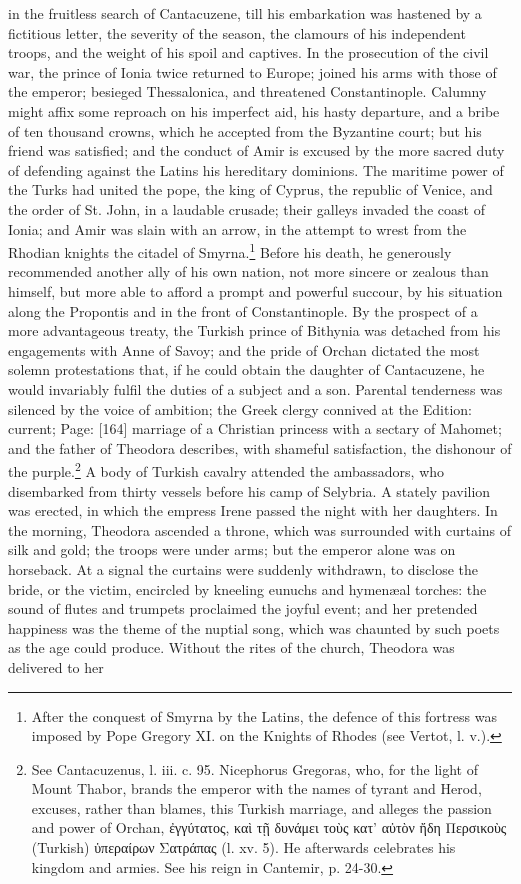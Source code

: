 in the fruitless search of Cantacuzene, till his embarkation was hastened by a fictitious letter, the severity of the season, the clamours of his independent troops, and the weight of his spoil and captives. In the prosecution of the civil war, the prince of Ionia twice returned to Europe; joined his arms with those of the emperor; besieged Thessalonica, and threatened Constantinople. Calumny might affix some reproach on his imperfect aid, his hasty departure, and a bribe of ten thousand crowns, which he accepted from the Byzantine court; but his friend was satisfied; and the conduct of Amir is excused by the more sacred duty of defending against the Latins his hereditary dominions. The maritime power of the Turks had united the pope, the king of Cyprus, the republic of Venice, and the order of St. John, in a laudable crusade; their galleys invaded the coast of Ionia; and Amir was slain with an arrow, in the attempt to wrest from the Rhodian knights the citadel of Smyrna.\footnote{After the conquest of Smyrna by the Latins, the defence of this fortress was imposed by Pope Gregory XI. on the Knights of Rhodes (see Vertot, l. v.).} Before his death, he generously recommended another ally of his own nation, not more sincere or zealous than himself, but more able to afford a prompt and powerful succour, by his situation along the Propontis and in the front of Constantinople. By the prospect of a more advantageous treaty, the Turkish prince of Bithynia was detached from his engagements with Anne of Savoy; and the pride of Orchan dictated the most solemn protestations that, if he could obtain the daughter of Cantacuzene, he would invariably fulfil the duties of a subject and a son. Parental tenderness was silenced by the voice of ambition; the Greek clergy connived at the Edition: current; Page: [164] marriage of a Christian princess with a sectary of Mahomet; and the father of Theodora describes, with shameful satisfaction, the dishonour of the purple.\footnote{See Cantacuzenus, l. iii. c. 95. Nicephorus Gregoras, who, for the light of Mount Thabor, brands the emperor with the names of tyrant and Herod, excuses, rather than blames, this Turkish marriage, and alleges the passion and power of Orchan, \textgreek{\texthebrew{ἐ}γγύτατος, κα\texthebrew{ὶ} τ\texthebrew{ῇ} δυνάμει το\texthebrew{ὺ}ς κατ\texthebrew{}’ α\texthebrew{ὐ}τ\texthebrew{ὸ}ν \texthebrew{ἤ}δη Περσικο\texthebrew{ὺ}ς} (Turkish) \textgreek{\texthebrew{ὑ}περαίρων Σατράπας} (l. xv. 5). He afterwards celebrates his kingdom and armies. See his reign in Cantemir, p. 24-30.} A body of Turkish cavalry attended the ambassadors, who disembarked from thirty vessels before his camp of Selybria. A stately pavilion was erected, in which the empress Irene passed the night with her daughters. In the morning, Theodora ascended a throne, which was surrounded with curtains of silk and gold; the troops were under arms; but the emperor alone was on horseback. At a signal the curtains were suddenly withdrawn, to disclose the bride, or the victim, encircled by kneeling eunuchs and hymenæal torches: the sound of flutes and trumpets proclaimed the joyful event; and her pretended happiness was the theme of the nuptial song, which was chaunted by such poets as the age could produce. Without the rites of the church, Theodora was delivered to her 